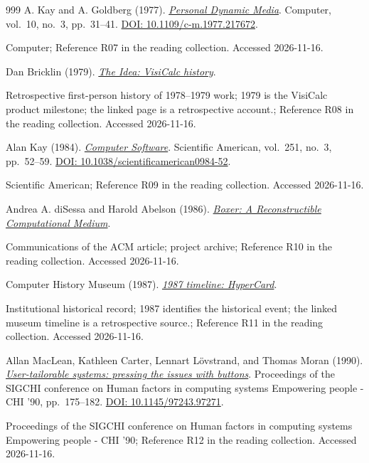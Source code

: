 \documentclass[11pt,letterpaper]{article}
\begin{document}
\begin{thebibliography}{999}
A. Kay and A. Goldberg (1977).
\href{https://doi.org/10.1109/c-m.1977.217672}{\emph{Personal Dynamic Media}}.
Computer, vol.~10, no.~3, pp.~31--41.
\href{https://doi.org/10.1109/c-m.1977.217672}{DOI: 10.1109/c-m.1977.217672}.
\par {\small Computer; Reference R07 in the reading collection.}
{\small Accessed 2026-11-16.}

Dan Bricklin (1979).
\href{https://bricklin.com/history/saiidea.htm}{\emph{The Idea: VisiCalc history}}.
\par {\small Retrospective first-person history of 1978–1979 work; 1979 is the VisiCalc product milestone; the linked page is a retrospective account.; Reference R08 in the reading collection.}
{\small Accessed 2026-11-16.}

Alan Kay (1984).
\href{https://doi.org/10.1038/scientificamerican0984-52}{\emph{Computer Software}}.
Scientific American, vol.~251, no.~3, pp.~52--59.
\href{https://doi.org/10.1038/scientificamerican0984-52}{DOI: 10.1038/scientificamerican0984-52}.
\par {\small Scientific American; Reference R09 in the reading collection.}
{\small Accessed 2026-11-16.}

Andrea A. diSessa and Harold Abelson (1986).
\href{https://boxer-project.github.io/boxer-literature/Flat\%20index/}{\emph{Boxer: A Reconstructible Computational Medium}}.
\par {\small Communications of the ACM article; project archive; Reference R10 in the reading collection.}
{\small Accessed 2026-11-16.}

Computer History Museum (1987).
\href{https://www.computerhistory.org/timeline/1987/}{\emph{1987 timeline: HyperCard}}.
\par {\small Institutional historical record; 1987 identifies the historical event; the linked museum timeline is a retrospective source.; Reference R11 in the reading collection.}
{\small Accessed 2026-11-16.}

Allan MacLean, Kathleen Carter, Lennart Lövstrand, and Thomas Moran (1990).
\href{https://doi.org/10.1145/97243.97271}{\emph{User-tailorable systems: pressing the issues with buttons}}.
Proceedings of the SIGCHI conference on Human factors in computing systems Empowering people - CHI '90, pp.~175--182.
\href{https://doi.org/10.1145/97243.97271}{DOI: 10.1145/97243.97271}.
\par {\small Proceedings of the SIGCHI conference on Human factors in computing systems Empowering people - CHI '90; Reference R12 in the reading collection.}
{\small Accessed 2026-11-16.}


\end{thebibliography}
\end{document}
